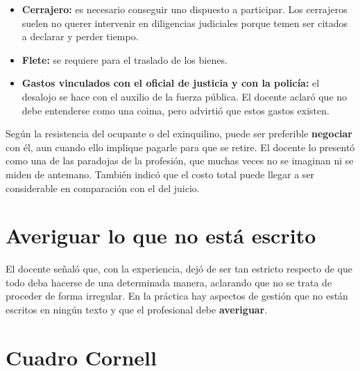 \documentclass[12pt,oneside]{book}
\begin{document}
\begin{itemize}
    \item \textbf{Cerrajero:} es necesario conseguir uno dispuesto a participar. Los cerrajeros suelen no querer intervenir en diligencias judiciales porque temen ser citados a declarar y perder tiempo.
    \item \textbf{Flete:} se requiere para el traslado de los bienes.
    \item \textbf{Gastos vinculados con el oficial de justicia y con la policía:} el desalojo se hace con el auxilio de la fuerza pública. El docente aclaró que no debe entenderse como una coima, pero advirtió que estos gastos existen.
\end{itemize}

Según la resistencia del ocupante o del exinquilino, puede ser preferible \textbf{negociar} con él, aun cuando ello implique pagarle para que se retire. El docente lo presentó como una de las paradojas de la profesión, que muchas veces no se imaginan ni se miden de antemano. También indicó que el costo total puede llegar a ser considerable en comparación con el del juicio.

\section{Averiguar lo que no está escrito}

\begin{note}
El docente señaló que, con la experiencia, dejó de ser tan estricto respecto de que todo deba hacerse de una determinada manera, aclarando que no se trata de proceder de forma irregular. En la práctica hay aspectos de gestión que no están escritos en ningún texto y que el profesional debe \textbf{averiguar}.
\end{note}

\section{Cuadro Cornell}
\end{document}
